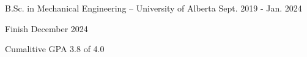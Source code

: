 \begin{cventries}
  \cventry
    {} %
    {B.Sc. in Mechanical Engineering -- University of Alberta} %
    {} %
    {Sept. 2019 - Jan. 2024} %
    {
      \begin{cvitems} %
        \item Finish December 2024
        \item Cumalitive GPA 3.8 of 4.0
      \end{cvitems}
    }
\end{cventries}

